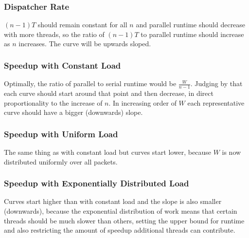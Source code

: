 \documentclass{article}
\begin{document}
\begin{adjustwidth}{-2cm}{-2cm}
\subsubsection{Dispatcher Rate}
$(n-1)T$ should remain constant for all $n$ and parallel runtime should decrease with more threads, so the ratio of $(n-1)T$ to parallel runtime should increase as $n$ increases. The curve will be upwards sloped.
\subsubsection{Speedup with Constant Load}
Optimally, the ratio of parallel to serial runtime would be $\frac{W}{n-1}$. Judging by that each curve should start around that point and then decrease, in direct proportionality to the increase of $n$. In increasing order of $W$ each representative curve should have a bigger (downwards) slope.
\subsubsection{Speedup with Uniform Load}
The same thing as with constant load but curves start lower, because $W$ is now distributed uniformly over all packets.
\subsubsection{Speedup with Exponentially Distributed Load}
Curves start higher than with constant load and the slope is also smaller (downwards), because the exponential distribution of work means that certain threads should be much slower than others, setting the upper bound for runtime and also restricting the amount of speedup additional threads can contribute.
\end{adjustwidth}
\end{document}
